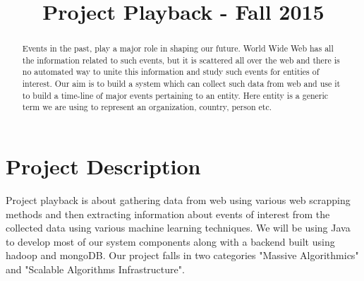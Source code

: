 \documentclass[10pt,conference]{IEEEtran}
\begin{document}
\title{Project Playback - Fall 2015}
\author{
\and
{}
\and
{}
}

\maketitle
\begin{abstract}
\textnormal{
Events in the past, play a major role in shaping our future. World Wide Web has
all the information related to such events, but it is scattered all over the
web and there is no automated way to unite this information and study such
events for entities of interest. Our aim is to build a system which can collect
such data from web and use it to build a time-line of major events pertaining
to an entity. Here entity is a generic term we are using to represent an
organization, country, person etc.
}
\end{abstract}

\IEEEpeerreviewmaketitle
\section{Project Description}\label{sec:1. Project Description}
Project playback is about gathering data from web using various web scrapping
methods and then extracting information about events of interest from the
collected data using various machine learning techniques. We will be using Java
to develop most of our system components along with a backend built using
hadoop and mongoDB. Our project falls in two categories "Massive Algorithmics"
and "Scalable Algorithms Infrastructure". 
\end{document}
